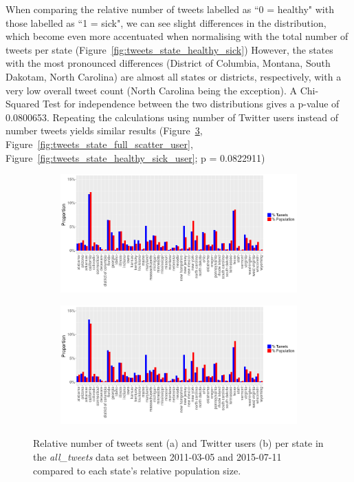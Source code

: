 \documentclass[11pt, a4paper]{report}\usepackage[]{graphicx}\usepackage[]{color}
\begin{document}
When comparing the relative number of tweets labelled as ``0 = healthy" with those labelled as ``1 = sick", we can see slight differences in the distribution, which become even more accentuated when normalising with the total number of tweets per state (Figure~\ref{fig:tweets_state_healthy_sick}) However, the states with the most pronounced differences (District of Columbia, Montana, South Dakotam, North Carolina) are almost all states or districts, respectively, with a very low overall tweet count (North Carolina being the exception). A Chi-Squared Test for independence between the two distributions gives a p-value of 0.0800653. Repeating the calculations using number of Twitter users instead of number tweets yields similar results (Figure~\ref{fig:tweets_state_full_user}, Figure~\ref{fig:tweets_state_full_scatter_user}, Figure~\ref{fig:tweets_state_healthy_sick_user}; p = 0.0822911)

\begin{figure}[H]
\centering
\begin{subfigure}[t]{1\textwidth}
  \includegraphics[width=1\linewidth]{activity_total_state_Twitter_full_aggregated.png}
  \caption{}
  \label{fig:tweets_state_full}
  \end{subfigure}
  
  \begin{subfigure}[t]{1\textwidth}
  \includegraphics[width=1\linewidth]{activity_total_user_state_Twitter_full_aggregated.png}
  \caption{}
    \label{fig:tweets_state_full_user}
  \end{subfigure}
\caption{Relative number of tweets sent (a) and Twitter users (b) per state in the \textit{all\_tweets} data set between 2011-03-05 and 2015-07-11 compared to each state's relative population size.}
\end{figure}
\end{document}

